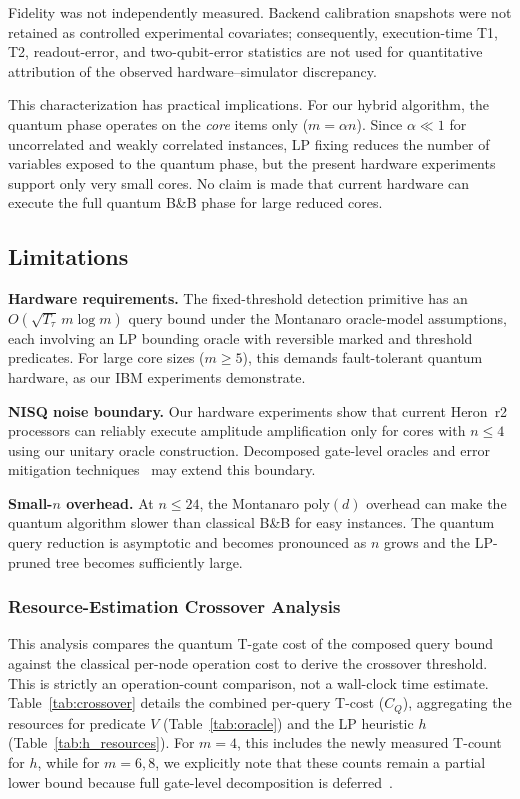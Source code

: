 \documentclass[conference]{IEEEtran}
\begin{document}
Fidelity was not independently measured. Backend calibration snapshots were not retained as controlled experimental covariates; consequently, execution-time T1, T2, readout-error, and two-qubit-error statistics are not used for quantitative attribution of the observed hardware--simulator discrepancy.

This characterization has practical implications. For our hybrid algorithm, the quantum phase operates on the \textit{core} items only ($m = \alpha n$). Since $\alpha \ll 1$ for uncorrelated and weakly correlated instances, LP fixing reduces the number of variables exposed to the quantum phase, but the present hardware experiments support only very small cores. No claim is made that current hardware can execute the full quantum B\&B phase for large reduced cores.


\subsection{Limitations}

\textbf{Hardware requirements.} The fixed-threshold detection primitive has an $O(\sqrt{T_{\tau}}\,m\log m)$ query bound under the Montanaro oracle-model assumptions, each involving an LP bounding oracle with reversible marked and threshold predicates. For large core sizes ($m \geq 5$), this demands fault-tolerant quantum hardware, as our IBM experiments demonstrate.

\textbf{NISQ noise boundary.} Our hardware experiments show that current Heron~r2 processors can reliably execute amplitude amplification only for cores with $n \leq 4$ using our unitary oracle construction. Decomposed gate-level oracles and error mitigation techniques~\cite{ref31} may extend this boundary.

\textbf{Small-$n$ overhead.} At $n \leq 24$, the Montanaro $\text{poly}(d)$ overhead can make the quantum algorithm slower than classical B\&B for easy instances. The quantum query reduction is asymptotic and becomes pronounced as $n$ grows and the LP-pruned tree becomes sufficiently large.

\subsubsection{Resource-Estimation Crossover Analysis}
This analysis compares the quantum T-gate cost of the composed query bound against the classical per-node operation cost to derive the crossover threshold. This is strictly an operation-count comparison, not a wall-clock time estimate. Table~\ref{tab:crossover} details the combined per-query T-cost ($C_Q$), aggregating the resources for predicate $V$ (Table~\ref{tab:oracle}) and the LP heuristic $h$ (Table~\ref{tab:h_resources}). For $m=4$, this includes the newly measured T-count for $h$, while for $m=6, 8$, we explicitly note that these counts remain a partial lower bound because full gate-level decomposition is deferred~\cite{vedral1996}.
\end{document}
